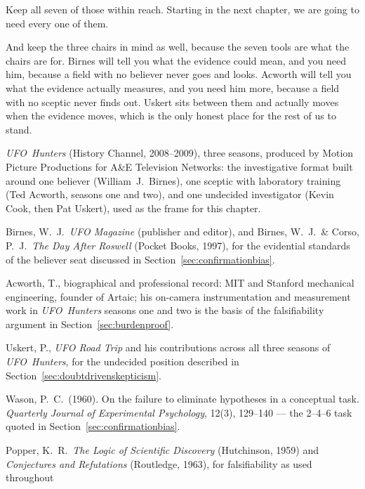 Keep all seven of those within reach. Starting in the next chapter, we are going to
need every one of them.

And keep the three chairs in mind as well, because the seven tools are what the chairs are for.
Birnes will tell you what the evidence could mean, and you need him, because a field with no
believer never goes and looks. Acworth will tell you what the evidence actually measures, and you
need him more, because a field with no sceptic never finds out. Uskert sits between them and
actually moves when the evidence moves, which is the only honest place for the rest of us to stand.

\begin{srcnotes}
\item \emph{UFO~Hunters} (History Channel, 2008--2009), three seasons, produced by Motion Picture
Productions for A\&E Television Networks: the investigative format built around one believer
(William~J.\ Birnes), one sceptic with laboratory training (Ted Acworth, seasons one and two), and
one undecided investigator (Kevin Cook, then Pat Uskert), used as the frame for this chapter.
\item Birnes, W.\ J.\ \emph{UFO Magazine} (publisher and editor), and Birnes, W.\ J.\ \& Corso,
P.\ J.\ \emph{The Day After Roswell} (Pocket Books, 1997), for the evidential standards of the
believer seat discussed in Section~\ref{sec:confirmationbias}.
\item Acworth, T., biographical and professional record: MIT and Stanford mechanical engineering,
founder of Artaic; his on-camera instrumentation and measurement work in
\emph{UFO~Hunters} seasons one and two is the basis of the falsifiability argument in
Section~\ref{sec:burdenproof}.
\item Uskert, P., \emph{UFO Road Trip} and his contributions across all three seasons of
\emph{UFO~Hunters}, for the undecided position described in
Section~\ref{sec:doubtdrivenskepticism}.
\item Wason, P.\ C.\ (1960). On the failure to eliminate hypotheses in a conceptual task.
\emph{Quarterly Journal of Experimental Psychology}, 12(3), 129--140 --- the 2--4--6 task quoted
in Section~\ref{sec:confirmationbias}.
\item Popper, K.\ R.\ \emph{The Logic of Scientific Discovery} (Hutchinson, 1959) and
\emph{Conjectures and Refutations} (Routledge, 1963), for falsifiability as used throughout

\end{srcnotes}

